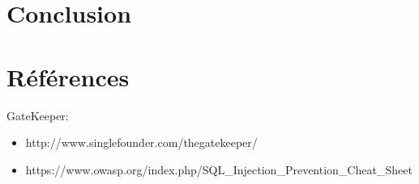 \documentclass[11pt]{article}
\begin{document}
\section{Conclusion}


%
%
\pagebreak
\section*{Références}
GateKeeper:
\begin{itemize}
	\item http://www.singlefounder.com/thegatekeeper/
	\item https://www.owasp.org/index.php/SQL\_Injection\_Prevention\_Cheat\_Sheet
\end{itemize}
\end{document}
